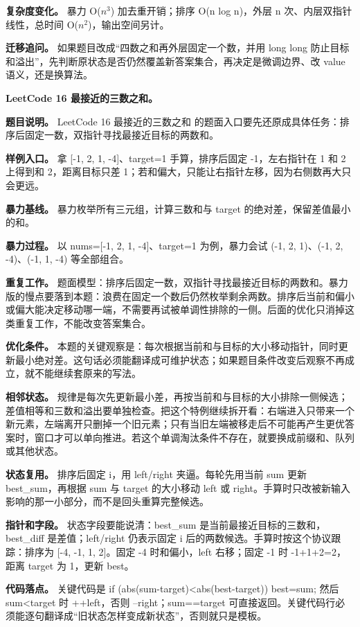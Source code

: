 \textbf{复杂度变化。} 暴力 O(\ensuremath{n^{3}}) 加去重开销；排序 O(n log n)，外层 n 次、内层双指针线性，总时间 O(\ensuremath{n^{2}})，输出空间另计。

\textbf{迁移追问。} 如果题目改成“四数之和再外层固定一个数，并用 long long 防止目标和溢出”，先判断原状态是否仍然覆盖新答案集合，再决定是微调边界、改 value 语义，还是换算法。

\noindent\textbf{LeetCode 16 最接近的三数之和。}

\textbf{题目说明。} LeetCode 16 最接近的三数之和 的题面入口要先还原成具体任务：排序后固定一数，双指针寻找最接近目标的两数和。

\textbf{样例入口。} 拿 [-1, 2, 1, -4]、target=1 手算，排序后固定 -1，左右指针在 1 和 2 上得到和 2，距离目标只差 1；若和偏大，只能让右指针左移，因为右侧数再大只会更远。

\textbf{暴力基线。} 暴力枚举所有三元组，计算三数和与 target 的绝对差，保留差值最小的和。

\textbf{暴力过程。} 以 nums=[-1, 2, 1, -4]、target=1 为例，暴力会试 (-1, 2, 1)、(-1, 2, -4)、(-1, 1, -4) 等全部组合。

\textbf{重复工作。} 题面模型：排序后固定一数，双指针寻找最接近目标的两数和。暴力版的慢点要落到本题：浪费在固定一个数后仍然枚举剩余两数。排序后当前和偏小或偏大能决定移动哪一端，不需要再试被单调性排除的一侧。后面的优化只消掉这类重复工作，不能改变答案集合。

\textbf{优化条件。} 本题的关键观察是：每次根据当前和与目标的大小移动指针，同时更新最小绝对差。这句话必须能翻译成可维护状态；如果题目条件改变后观察不再成立，就不能继续套原来的写法。

\textbf{相邻状态。} 规律是每次先更新最小差，再按当前和与目标的大小排除一侧候选；差值相等和三数和溢出要单独检查。把这个特例继续拆开看：右端进入只带来一个新元素，左端离开只删掉一个旧元素；只有当旧左端被移走后不可能再产生更优答案时，窗口才可以单向推进。若这个单调淘汰条件不存在，就要换成前缀和、队列或其他状态。

\textbf{状态复用。} 排序后固定 i，用 left/right 夹逼。每轮先用当前 sum 更新 best\_sum，再根据 sum 与 target 的大小移动 left 或 right。手算时只改被新输入影响的那一小部分，而不是回头重算完整候选。

\textbf{指针和字段。} 状态字段要能说清：best\_sum 是当前最接近目标的三数和，best\_diff 是差值；left/right 仍表示固定 i 后的两数候选。手算时按这个协议跟踪：排序为 [-4, -1, 1, 2]。固定 -4 时和偏小，left 右移；固定 -1 时  -1+1+2=2，距离 target 为 1，更新 best。

\textbf{代码落点。} 关键代码是 if (abs(sum-target)<abs(best-target)) best=sum; 然后 sum<target 时 ++left，否则 --right；sum==target 可直接返回。关键代码行必须能逐句翻译成“旧状态怎样变成新状态”，否则就只是模板。

